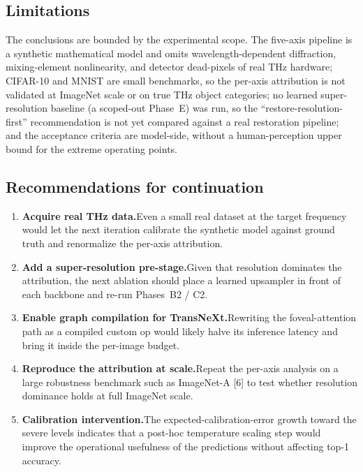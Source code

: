 \subsection{Limitations}
The conclusions are bounded by the experimental scope. The five-axis pipeline is
a synthetic mathematical model and omits wavelength-dependent diffraction,
mixing-element nonlinearity, and detector dead-pixels of real THz hardware;
CIFAR-10 and MNIST are small benchmarks, so the per-axis attribution is not
validated at ImageNet scale or on true THz object categories; no learned
super-resolution baseline (a scoped-out Phase~E) was run, so the
``restore-resolution-first'' recommendation is not yet compared against a real
restoration pipeline; and the acceptance criteria are model-side, without a
human-perception upper bound for the extreme operating points.

\subsection{Recommendations for continuation}
\begin{enumerate}
  \item \textbf{Acquire real THz data.}\quad Even a small real dataset at the
        target frequency would let the next iteration calibrate the synthetic
        model against ground truth and renormalize the per-axis attribution.
  \item \textbf{Add a super-resolution pre-stage.}\quad Given that resolution
        dominates the attribution, the next ablation should place a learned
        upsampler in front of each backbone and re-run Phases~B2 / C2.
  \item \textbf{Enable graph compilation for TransNeXt.}\quad Rewriting the
        foveal-attention path as a compiled custom op would likely halve its
        inference latency and bring it inside the per-image budget.
  \item \textbf{Reproduce the attribution at scale.}\quad Repeat the per-axis
        analysis on a large robustness benchmark such as ImageNet-A
        [6] to test whether resolution dominance
        holds at full ImageNet scale.
  \item \textbf{Calibration intervention.}\quad The expected-calibration-error
        growth toward the severe levels indicates that a post-hoc temperature
        scaling step would improve the operational usefulness of the
        predictions without affecting top-1 accuracy.
\end{enumerate}
